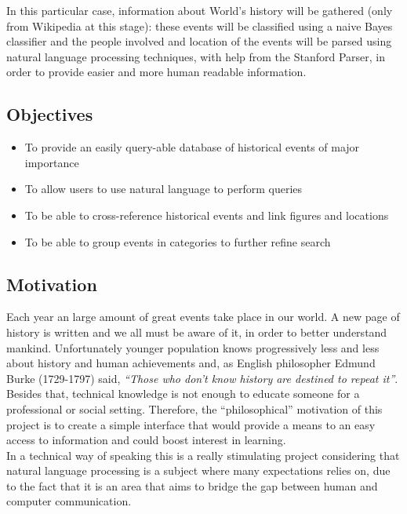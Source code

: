 \documentclass{llncs}
\begin{document}
In this particular case, information about World's history will be gathered (only from Wikipedia at this stage): these events will be classified using a naive Bayes classifier and the people involved and location of the events will be parsed using natural language processing techniques, with help from the Stanford Parser\cite{sp}, in order to provide easier and more human readable information.\\

\subsection{Objectives}

\begin{itemize}
	\item To provide an easily query-able database of historical events of major importance
	\item To allow users to use natural language to perform queries
	\item To be able to cross-reference historical events and link figures and locations
	\item To be able to group events in categories to further refine search
\end{itemize}

\subsection{Motivation}

Each year an large amount of great events take place in our world. A new page of history is written and we all must be aware of it, in order to better understand mankind. Unfortunately younger population knows progressively less and less about history and human achievements and, as English philosopher Edmund Burke (1729-1797) said, \textit{``Those who don't know history are destined to repeat it''}. Besides that, technical knowledge is not enough to educate someone for a professional or social setting.
Therefore, the ``philosophical'' motivation of this project is to create a simple interface that would provide a means to an easy access to information and could boost interest in learning.\\

In a technical way of speaking this is a really stimulating project considering that natural language processing is a subject where many expectations relies on, due to the fact that it is an area that aims to bridge the gap between human and computer communication.
\end{document}
